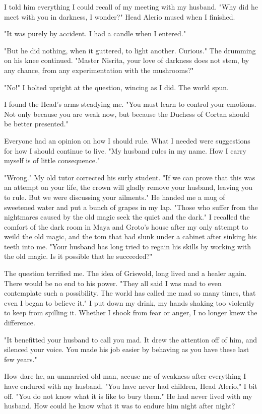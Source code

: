 \documentclass{article}
\begin{document}
I told him everything I could recall of my meeting with my husband. "Why did he meet with you in darkness, I wonder?" Head Alerio mused when I finished.

"It was purely by accident. I had a candle when I entered."

"But he did nothing, when it guttered, to light another. Curious." The drumming on his knee continued. "Master Nisrita, your love of darkness does not stem, by any chance, from any experimentation with the mushrooms?"

"No!" I bolted upright at the question, wincing as I did. The world spun.

I found the Head's arms steadying me. "You must learn to control your emotions. Not only because you are weak now, but because the Duchess of Cortan should be better presented."

Everyone had an opinion on how I should rule. What I needed were suggestions for how I should continue to live. "My husband rules in my name. How I carry myself is of little consequence."

"Wrong." My old tutor corrected his surly student. "If we can prove that this was an attempt on your life, the crown will gladly remove your husband, leaving you to rule. But we were discussing your ailments." He handed me a mug of sweetened water and put a bunch of grapes in my lap. "Those who suffer from the nightmares caused by the old magic seek the quiet and the dark." I recalled the comfort of the dark room in Maya and Groto's house after my only attempt to weild the old magic, and the tom that had slunk under a cabinet after sinking his teeth into me. "Your husband has long tried to regain his skills by working with the old magic. Is it possible that he succeeded?"

The question terrified me. The idea of Griswold, long lived and a healer again. There would be no end to his power. "They all said I was mad to even contemplate such a possibility. The world has called me mad so many times, that even I began to believe it." I put down my drink, my hands shaking too violently to keep from spilling it. Whether I shook from fear or anger, I no longer knew the difference.

"It benefitted your husband to call you mad. It drew the attention off of him, and silenced your voice. You made his job easier by behaving as you have these last few years."

How dare he, an unmarried old man, accuse me of weakness after everything I have endured with my husband. "You have never had children, Head Alerio," I bit off. "You do not know what it is like to bury them." He had never lived with my husband. How could he know what it was to endure him night after night?
\end{document}
